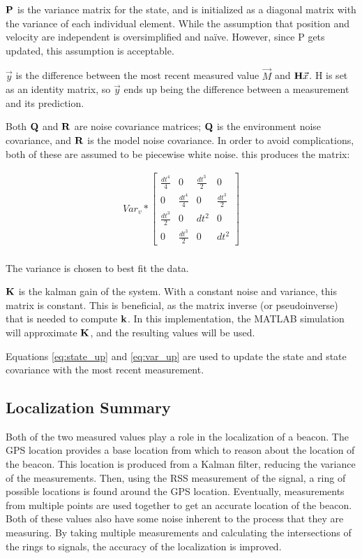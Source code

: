 $\mathbf{P}$ is the variance matrix for the state, and is initialized as a diagonal matrix with the variance of each individual element. While the assumption that position and velocity are independent is oversimplified and na{\"i}ve. However, since P gets updated, this assumption is acceptable. \par
$\vec{y}$ is the difference between the most recent measured value $\vec{M}$ and $\mathbf{H}\vec{x}$. H is set as an identity matrix, so $\vec{y}$ ends up being the difference between a measurement and its prediction. \par
Both $\mathbf{Q}$ and $\mathbf{R}$ are noise covariance matrices; $\mathbf{Q}$ is the environment noise covariance, and $\mathbf{R}$ is the model noise covariance. In order to avoid complications, both of these are assumed to be piecewise white noise. this produces the matrix: 

\begin{align}
Var_v * \begin{bmatrix}\frac{dt^4}{4} & 0 & \frac{dt^3}{2} & 0\\0 & \frac{dt^4}{4} & 0 & \frac{dt^3}{2}\\\frac{dt^3}{2} & 0 & dt^2 & 0 \\ 0 & \frac{dt^3}{2} & 0 & dt^2  \end{bmatrix}
\end{align} \\
The variance is chosen to best fit the data. \par
$\mathbf{K}$ is the kalman gain of the system. With a constant noise and variance, this matrix is constant. This is beneficial, as the matrix inverse (or pseudoinverse) that is needed to compute $\mathbf{k}$. In this implementation, the MATLAB simulation will approximate $\mathbf{K}$, and the resulting values will be used. \par
Equations \ref{eq:state_up} and \ref{eq:var_up} are used to update the state and state covariance with the most recent measurement.

\subsection{Localization Summary}
Both of the two measured values play a role in the localization of a beacon. The GPS location provides a base location from which to reason about the location of the beacon. This location is produced from a Kalman filter, reducing the variance of the measurements. Then, using the RSS measurement of the signal, a ring of possible locations is found around the GPS location. Eventually, measurements from multiple points are used together to get an accurate location of the beacon. Both of these values also have some noise inherent to the process that they are measuring. By taking multiple measurements and calculating the intersections of the rings to signals, the accuracy of the localization is improved.

